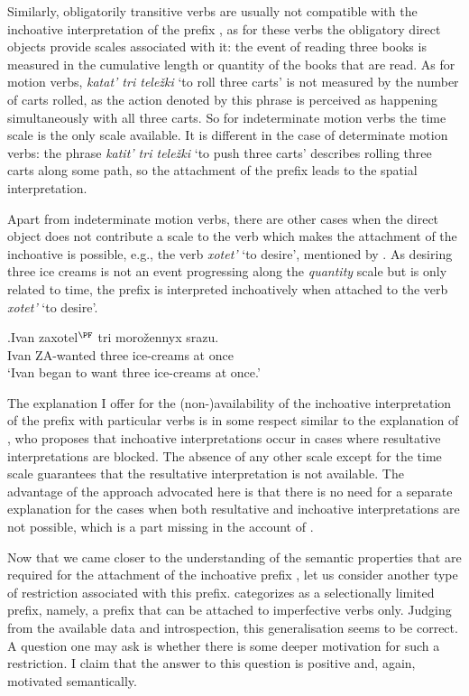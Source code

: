 Similarly, obligatorily transitive verbs are usually not compatible with the inchoative interpretation of the prefix , as for these verbs the obligatory direct objects provide scales associated with it: the event of reading three books is measured in the cumulative length or quantity of the books that are read. As for motion verbs, \textit{katat' tri tele\v{z}ki} `to roll three carts' is not measured by the number of carts rolled, as the action denoted by this phrase is perceived as happening simultaneously with all three carts. So for indeterminate motion verbs the time scale is the only scale available. It is different in the case of determinate motion verbs: the phrase \textit{katit' tri tele\v{z}ki} `to push three carts' describes rolling three carts along some path, so the attachment of the prefix  leads to the spatial interpretation.

Apart from indeterminate motion verbs, there are other cases when the direct object does not contribute a scale to the verb which makes the attachment of the inchoative  is possible, e.g., the verb \textit{xotet'} `to desire', mentioned by \citet{Braginsky:08}. As desiring three ice creams is not an event progressing along the \textit{quantity} scale but is only related to time, the prefix  is interpreted inchoatively when attached to the verb \textit{xotet'} `to desire'.

\exg.\label{ex:zaxotet}Ivan zaxotel$^{\PF}$ tri moro\v{z}ennyx srazu.\\
Ivan ZA-wanted three ice-creams {at once}\\
\trans `Ivan began to want three ice-creams at once.'
\\

The explanation I offer for the (non-)availability of the inchoative interpretation of the prefix  with particular verbs is in some respect similar to the explanation of \citet{Braginsky:08}, who proposes that inchoative interpretations occur in cases where resultative interpretations are blocked. The absence of any other scale except for the time scale guarantees that the resultative interpretation is not available. The advantage of the approach advocated here is that there is no need for a separate explanation for the cases when both resultative and inchoative interpretations are not possible, which is a part missing in the account of \citet{Braginsky:08}.

Now that we came closer to the understanding of the semantic properties that are required for the attachment of the inchoative prefix , let us consider another type of restriction associated with this prefix. \citet{Tatevosov:09} categorizes  as a selectionally limited prefix, namely, a prefix that can be attached to imperfective verbs only. Judging from the available data and introspection, this generalisation seems to be correct. A question one may ask is whether there is some deeper motivation for such a restriction. I claim that the answer to this question is positive and, again, motivated semantically. 

